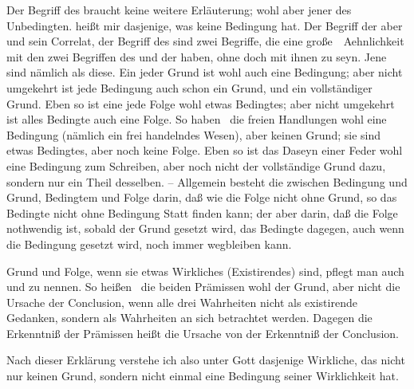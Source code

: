 \begin{aufza}
\item Der Begriff des  braucht keine weitere Erläuterung; wohl aber jener des Unbedingten.  heißt mir dasjenige, was keine Bedingung hat. Der Begriff der  aber und sein Correlat, der Begriff des  sind zwei Begriffe, die eine große~\ Aehnlichkeit mit den zwei Begriffen des  und der  haben, ohne doch  mit ihnen zu seyn. Jene sind nämlich  als diese. Ein jeder Grund ist wohl auch eine Bedingung; aber nicht umgekehrt ist jede Bedingung auch schon ein Grund, und ein vollständiger Grund. Eben so ist eine jede Folge wohl etwas Bedingtes; aber nicht umgekehrt ist alles Bedingte auch eine Folge. So haben \zB\ die freien Handlungen wohl eine Bedingung (nämlich ein frei handelndes Wesen), aber keinen Grund; sie sind etwas Bedingtes, aber noch keine Folge. Eben so ist das Daseyn einer Feder wohl eine Bedingung zum Schreiben, aber noch nicht der vollständige Grund dazu, sondern nur ein Theil desselben. -- Allgemein besteht die  zwischen Bedingung und Grund, Bedingtem und Folge darin, daß wie die Folge nicht ohne Grund, so das Bedingte nicht ohne Bedingung Statt finden kann; der  aber darin, daß die Folge nothwendig ist, sobald der Grund gesetzt wird, das Bedingte dagegen, auch wenn die Bedingung gesetzt wird, noch immer wegbleiben kann.
\begin{RWanm}
Grund und Folge, wenn sie etwas Wirkliches (Existirendes) sind, pflegt man auch  und  zu nennen. So heißen \zB\ die beiden Prämissen wohl der Grund, aber nicht die Ursache der Conclusion, wenn alle drei Wahrheiten nicht als existirende Gedanken, sondern als Wahrheiten an sich betrachtet werden. Dagegen die Erkenntniß der Prämissen heißt die Ursache von der Erkenntniß der Conclusion.
\end{RWanm}
\item Nach dieser Erklärung verstehe ich also unter Gott dasjenige Wirkliche, das nicht nur keinen Grund, sondern nicht einmal eine Bedingung seiner Wirklichkeit hat.

\end{aufza}
